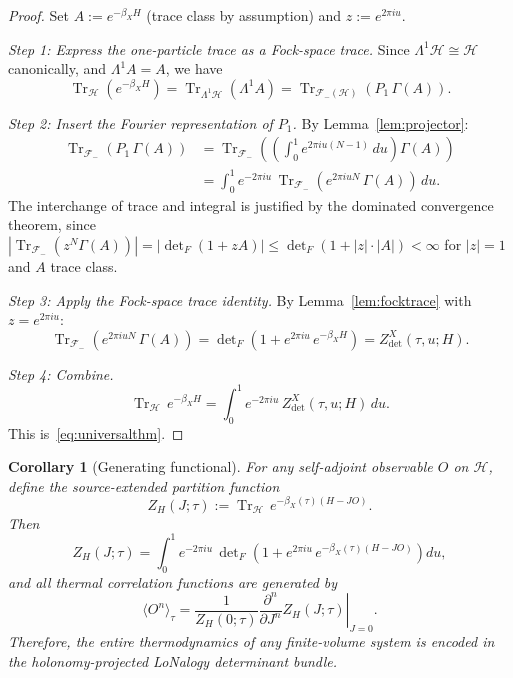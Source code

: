 \documentclass[12pt]{article}
\theoremstyle{plain}
\newtheorem{corollary}[theorem]{Corollary}
\theoremstyle{definition}
\numberwithin{equation}{section}
\DeclareMathOperator{\Tr}{Tr}
\begin{document}
\begin{proof}
Set $A:=e^{-\beta_X H}$ (trace class by assumption) and $z:=e^{2\pi iu}$.

\emph{Step 1: Express the one-particle trace as a Fock-space trace.}
Since $\Lambda^1\mathcal{H}\cong\mathcal{H}$ canonically, and
$\Lambda^1 A=A$, we have
\begin{equation}
\Tr_{\mathcal{H}}(e^{-\beta_X H})
= \Tr_{\Lambda^1\mathcal{H}}(\Lambda^1 A)
= \Tr_{\mathcal{F}_-(\mathcal{H})}(P_1\,\Gamma(A)).
\end{equation}

\emph{Step 2: Insert the Fourier representation of $P_1$.}
By Lemma~\ref{lem:projector}:
\begin{align}
\Tr_{\mathcal{F}_-}(P_1\,\Gamma(A))
&= \Tr_{\mathcal{F}_-}\!\left(
\left(\int_0^1 e^{2\pi iu(N-1)}\,du\right)\Gamma(A)\right)\\
&= \int_0^1 e^{-2\pi iu}\,
\Tr_{\mathcal{F}_-}\!\left(e^{2\pi iuN}\,\Gamma(A)\right)\,du.
\end{align}
The interchange of trace and integral is justified by the dominated
convergence theorem, since $|\Tr_{\mathcal{F}_-}(z^N\Gamma(A))|
=|\det_F(1+zA)|\leq\det_F(1+|z|\cdot|A|)<\infty$ for $|z|=1$ and
$A$ trace class.

\emph{Step 3: Apply the Fock-space trace identity.}
By Lemma~\ref{lem:focktrace} with $z=e^{2\pi iu}$:
\begin{equation}
\Tr_{\mathcal{F}_-}\!\left(e^{2\pi iuN}\,\Gamma(A)\right)
= \det\nolimits_F\!\left(1+e^{2\pi iu}\,e^{-\beta_X H}\right)
= Z_{\det}^X(\tau,u;H).
\end{equation}

\emph{Step 4: Combine.}
\begin{equation}
\Tr_{\mathcal{H}}\,e^{-\beta_X H}
= \int_0^1 e^{-2\pi iu}\,Z_{\det}^X(\tau,u;H)\,du.
\end{equation}
This is~\eqref{eq:universalthm}.
\end{proof}

\begin{corollary}[Generating functional]\label{cor:generating}
For any self-adjoint observable $O$ on $\mathcal{H}$, define the
source-extended partition function
\begin{equation}
Z_H(J;\tau) := \Tr_{\mathcal{H}}\,e^{-\beta_X(\tau)(H-JO)}.
\end{equation}
Then
\begin{equation}
\boxed{Z_H(J;\tau)
= \int_0^1 e^{-2\pi iu}\,
\det\nolimits_F\!\left(1+e^{2\pi iu}\,e^{-\beta_X(\tau)(H-JO)}\right)du,}
\end{equation}
and all thermal correlation functions are generated by
\begin{equation}
\langle O^n\rangle_\tau
= \frac{1}{Z_H(0;\tau)}
\left.\frac{\partial^n}{\partial J^n}Z_H(J;\tau)\right|_{J=0}.
\end{equation}
Therefore, the entire thermodynamics of any finite-volume system is
encoded in the holonomy-projected LoNalogy determinant bundle.
\end{corollary}
\end{document}
